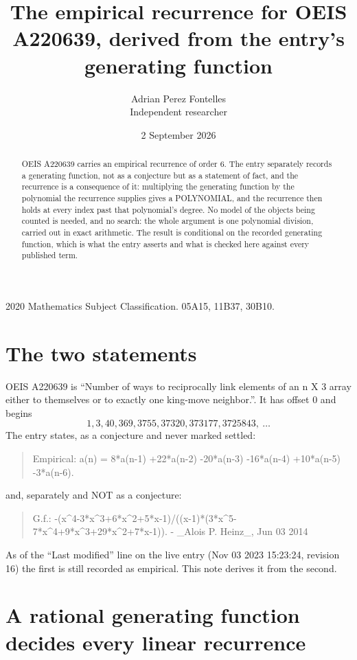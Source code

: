 \documentclass[11pt,a4paper]{article}
\title{The empirical recurrence for OEIS A220639, derived from the entry's generating function}
\author{Adrian Perez Fontelles\\ \small Independent researcher}
\date{2 September 2026}
\theoremstyle{plain}
\theoremstyle{definition}
\begin{document}
\maketitle

\begin{abstract}
OEIS A220639 carries an empirical recurrence of order $6$. The entry separately records a
generating function, not as a conjecture but as a statement of fact, and the recurrence is a
consequence of it: multiplying the generating function by the polynomial the recurrence
supplies gives a POLYNOMIAL, and the recurrence then holds at every index past that
polynomial's degree. No model of the objects being counted is needed, and no search: the
whole argument is one polynomial division, carried out in exact arithmetic. The result is
conditional on the recorded generating function, which is what the entry asserts and what is
checked here against every published term.
\end{abstract}

\noindent\small 2020 Mathematics Subject Classification. 05A15, 11B37, 30B10.\normalsize

\section{The two statements}

OEIS A220639 is ``Number of ways to reciprocally link elements of an n X 3 array either to themselves or to exactly one king-move neighbor.''. It has offset $0$ and begins
\[
1, 3, 40, 369, 3755, 37320, 373177, 3725843,\ \dots
\]
The entry states, as a conjecture and never marked settled:
\begin{quote}
Empirical: a(n) = 8*a(n-1) +22*a(n-2) -20*a(n-3) -16*a(n-4) +10*a(n-5) -3*a(n-6).
\end{quote}
and, separately and NOT as a conjecture:
\begin{quote}
G.f.: -(x\^{}4-3*x\^{}3+6*x\^{}2+5*x-1)/((x-1)*(3*x\^{}5-7*x\^{}4+9*x\^{}3+29*x\^{}2+7*x-1)). - \_Alois P. Heinz\_, Jun 03 2014
\end{quote}
As of the ``Last modified'' line on the live entry (Nov 03 2023 15:23:24, revision 16) the first is still
recorded as empirical. This note derives it from the second.

\section{A rational generating function decides every linear recurrence}
\end{document}
